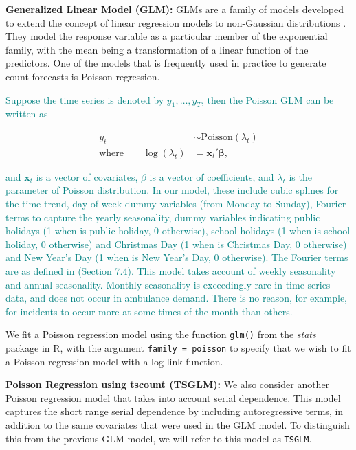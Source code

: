 \documentclass[
  authoryear,
  preprint,
  3p]{elsarticle}
\begin{document}
\textbf{Generalized Linear Model (GLM):} GLMs are a family of models
developed to extend the concept of linear regression models to
non-Gaussian distributions \citep{Faraway2016}. They model the response
variable as a particular member of the exponential family, with the mean
being a transformation of a linear function of the predictors. One of
the models that is frequently used in practice to generate count
forecasts is Poisson regression.

\textcolor{teal}{Suppose the time series is denoted by $y_1,\dots,y_T$, then the Poisson GLM can be written as}

\begin{align*}
  y_t &\sim \text{Poisson}(\lambda_t) \\
  \text{where}\qquad
  \log(\lambda_t) &= \bm{x}_t'\bm{\beta},
\end{align*}

\textcolor{teal}{and $\bm{x}_t$ is a vector of covariates, $\beta$ is a vector of coefficients, and $\lambda_t$ is the parameter of Poisson distribution. In our model, these include cubic splines for the time trend, day-of-week dummy variables (from Monday to Sunday), Fourier terms to capture the yearly seasonality, dummy variables indicating public holidays (1 when is public holiday, 0 otherwise), school holidays (1 when is school holiday, 0 otherwise) and Christmas Day (1 when is Christmas Day, 0 otherwise) and New Year's Day (1 when is New Year's Day, 0 otherwise). The Fourier terms are as defined in}
\citet{hyndman2021forecasting}
\textcolor{teal}{(Section 7.4). This model takes account of weekly seasonality and annual seasonality. Monthly seasonality is exceedingly rare in time series data, and does not occur in ambulance demand. There is no reason, for example, for incidents to occur more at some times of the month than others.}

We fit a Poisson regression model using the function \texttt{glm()} from
the \emph{stats} package in R, with the argument
\texttt{family\ =\ poisson} to specify that we wish to fit a Poisson
regression model with a log link function.

\textbf{Poisson Regression using tscount (TSGLM):} We also consider
another Poisson regression model that takes into account serial
dependence. This model captures the short range serial dependence by
including autoregressive terms, in addition to the same covariates that
were used in the GLM model. To distinguish this from the previous GLM
model, we will refer to this model as \texttt{TSGLM}.
\end{document}
